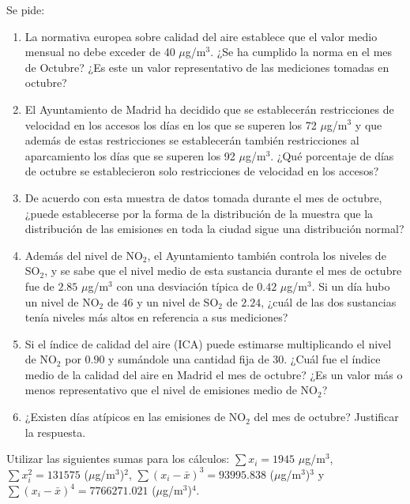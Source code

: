 \documentclass[aspectratio=149,10pt,t]{beamer}
\begin{document}
\begin{frame}[c]
	\large
	Se pide: 
	
	\begin{enumerate}
		\item La normativa europea sobre calidad del aire establece que el valor medio mensual no debe exceder de 40 $\mu$g/m$^3$. ¿Se ha cumplido la norma en el mes de Octubre? 
		¿Es este un valor representativo de las mediciones tomadas en octubre?
		\item El Ayuntamiento de Madrid ha decidido que se establecerán restricciones de velocidad en los accesos los días en los que se superen los 72 $\mu$g/m$^3$ y que además de estas restricciones se establecerán también restricciones al aparcamiento los días que se superen los 92 $\mu$g/m$^3$.
		¿Qué porcentaje de días de octubre se establecieron solo restricciones de velocidad en los accesos?
		\item De acuerdo con esta muestra de datos tomada durante el mes de octubre, ¿puede establecerse por la forma de la distribución de la muestra que la distribución de las emisiones en toda la ciudad sigue una distribución normal?
	\end{enumerate}
\end{frame}


\begin{frame}[c]
	\large
	\begin{enumerate}
		\setcounter{enumi}{3}
		\item Además del nivel de NO$_2$, el Ayuntamiento también controla los niveles de SO$_2$, y se sabe que el nivel medio de esta sustancia durante el mes de octubre fue de $2.85$ $\mu$g/m$^3$ con una desviación típica de $0.42$ $\mu$g/m$^3$. 
		Si un día hubo un nivel de NO$_2$ de 46 y un nivel de SO$_2$ de $2.24$, ¿cuál de las dos sustancias tenía niveles más altos en referencia a sus mediciones?
		\item Si el índice de calidad del aire (ICA) puede estimarse multiplicando el nivel de NO$_2$ por $0.90$ y sumándole una cantidad fija de 30. 
		¿Cuál fue el índice medio de la calidad del aire en Madrid el mes de octubre? 
		¿Es un valor más o menos representativo que el nivel de emisiones medio de NO$_2$?
		\item ¿Existen días atípicos en las emisiones de NO$_2$ del mes de octubre? Justificar la respuesta.
	\end{enumerate}
	Utilizar las siguientes sumas para los cálculos: $\sum x_i=1945$ $\mu$g/m$^3$, $\sum x_i^2=131575$ ($\mu$g/m$^3$)$^2$, $\sum (x_i-\bar x)^3=93995.838$ ($\mu$g/m$^3$)$^3$ y $\sum (x_i-\bar x)^4=7766271.021$ ($\mu$g/m$^3$)$^4$.
\end{frame}
\end{document}
